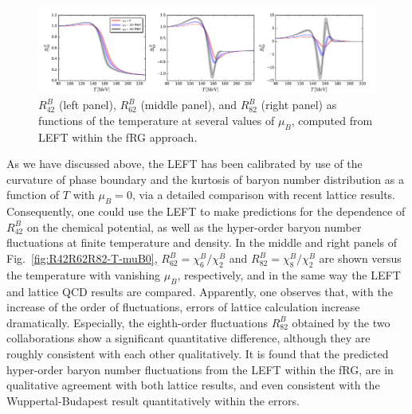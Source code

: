 \documentclass[%
reprint,
superscriptaddress,
showpacs,preprintnumbers,
 amsmath,amssymb,
 aps,
prd,
]{revtex4-1}
\def\Fig#1{Fig.~\ref{#1}} \def\Tab#1{Tab.~\ref{#1}}
\begin{document}
%
\begin{figure}[t]
\includegraphics[width=1.\textwidth]{R42R62R82-T-muB0to160}
\caption{$R^{B}_{42}$ (left panel), $R^{B}_{62}$ (middle panel), and $R^{B}_{82}$ (right panel) as functions of the temperature at several values of $\mu_B$, computed from LEFT within the fRG approach.}\label{fig:R42R62R82-T-muB0to160}
\end{figure}
%



As we have discussed above, the LEFT has been calibrated by use of the curvature of phase boundary and the kurtosis of baryon number distribution as a function of $T$ with $\mu_B=0$, via a detailed comparison with recent lattice results. Consequently, one could use the LEFT to make predictions for the dependence of $R^{B}_{42}$ on the chemical potential, as well as the hyper-order baryon number fluctuations at finite temperature and density. In the middle and right panels of \Fig{fig:R42R62R82-T-muB0}, $R^{B}_{62}=\chi^{B}_{6}/\chi^{B}_{2}$ and $R^{B}_{82}=\chi^{B}_{8}/\chi^{B}_{2}$ are shown versus the temperature with vanishing $\mu_B$, respectively, and in the same way the LEFT and lattice QCD results are compared. Apparently, one observes that, with the increase of the order of fluctuations, errors of lattice calculation increase dramatically. Especially, the eighth-order fluctuations $R^{B}_{82}$ obtained by the two collaborations show a significant quantitative difference, although they are roughly consistent with each other qualitatively. It is found that the predicted hyper-order baryon number fluctuations from the LEFT within the fRG, are in qualitative agreement with both lattice results, and even consistent with the Wuppertal-Budapest result quantitatively within the errors.
\end{document}
